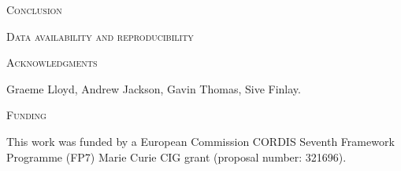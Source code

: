 \documentclass[12pt,letterpaper]{article}
\renewcommand{\section}[1]{%
\bigskip
\begin{center}
\begin{Large}
\normalfont\scshape #1
\medskip
\end{Large}
\end{center}}
\begin{document}
\section{Conclusion}



\section{Data availability and reproducibility}

\section{Acknowledgments}
Graeme Lloyd, Andrew Jackson, Gavin Thomas, Sive Finlay.

\section{Funding} %
This work was funded by a European Commission CORDIS Seventh Framework Programme (FP7) Marie Curie CIG grant (proposal number: 321696).





\end{document}
